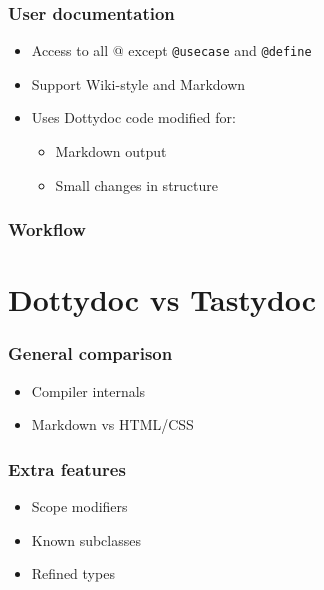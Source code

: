 \documentclass{beamer}
\begin{document}
\begin{frame}[fragile]
  \frametitle{User documentation}
  \begin{itemize}
    \item Access to all @ except \texttt{@usecase} and \texttt{@define}\pause
    \item Support Wiki-style and Markdown \pause
    \item Uses Dottydoc code modified for:
    \begin{itemize}
      \item Markdown output
      \item Small changes in structure 
    \end{itemize}
  \end{itemize}
\end{frame}

\begin{frame}
  \frametitle{Workflow}
  \begin{center}
  \end{center}
\end{frame}

\section{Dottydoc vs Tastydoc}

\begin{frame}
  \frametitle{General comparison}
  \begin{itemize}
    \item Compiler internals \pause
    \item Markdown vs HTML/CSS
  \end{itemize}
\end{frame}

\begin{frame}
  \frametitle{Extra features}
  \begin{itemize}
    \item Scope modifiers \pause
    \item Known subclasses \pause
    \item Refined types
  \end{itemize}
\end{frame}
\end{document}
